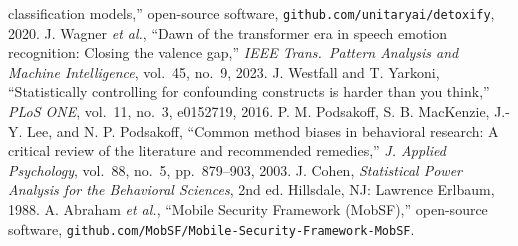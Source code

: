 classification models,'' open-source software,
\texttt{github.com/unitaryai/detoxify}, 2020.
 J. Wagner \emph{et al.}, ``Dawn of the transformer era in speech
emotion recognition: Closing the valence gap,'' \emph{IEEE Trans.\ Pattern Analysis
and Machine Intelligence}, vol.~45, no.~9, 2023.
 J. Westfall and T. Yarkoni, ``Statistically controlling for confounding
constructs is harder than you think,'' \emph{PLoS ONE}, vol.~11, no.~3, e0152719, 2016.
 P. M. Podsakoff, S. B. MacKenzie, J.-Y. Lee, and N. P. Podsakoff,
``Common method biases in behavioral research: A critical review of the literature and
recommended remedies,'' \emph{J. Applied Psychology}, vol.~88, no.~5, pp.~879--903, 2003.
 J. Cohen, \emph{Statistical Power Analysis for the Behavioral Sciences},
2nd ed. Hillsdale, NJ: Lawrence Erlbaum, 1988.
 A. Abraham \emph{et al.}, ``Mobile Security Framework (MobSF),''
open-source software, \texttt{github.com/MobSF/Mobile-Security-Framework-MobSF}.
